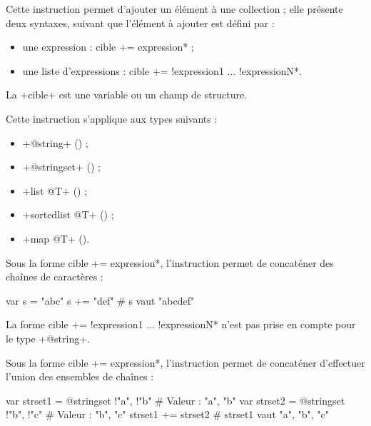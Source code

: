 
Cette instruction permet d'ajouter un élément à une collection ; elle présente deux syntaxes, suivant que l'élément à ajouter est défini par :
\begin{itemize}
  \item une expression : \ggs*cible += expression* ;
  \item une liste d'expressions : \ggs*cible += !expression1 ... !expressionN*.
\end{itemize}


La \ggs+cible+ est une variable ou un champ de structure.

Cette instruction s'applique aux types suivants :
\begin{itemize}
  \item \ggs+@string+ () ;
  \item \ggs+@stringset+ () ;
  \item \ggs+list @T+ () ;
  \item \ggs+sortedlist @T+ () ;
  \item \ggs+map @T+ ().
\end{itemize}



Sous la forme \ggs*cible += expression*, l'instruction permet de concaténer des chaînes de caractères :
\begin{galgas}
var s = "abc"
s += "def" # s vaut "abcdef"
\end{galgas}

La forme \ggs*cible += !expression1 ... !expressionN* n'est pas prise en compte pour le type \ggs+@string+.




Sous la forme \ggs*cible += expression*, l'instruction permet de concaténer d'effectuer l'union des ensembles de chaînes :
\begin{galgas}
var strset1 = @stringset {!"a", !"b"} # Valeur : "a", "b"
var strset2 = @stringset {!"b", !"c"} # Valeur : "b", "c"
strset1 += strset2 # strset1 vaut "a", "b", "c"
\end{galgas}

